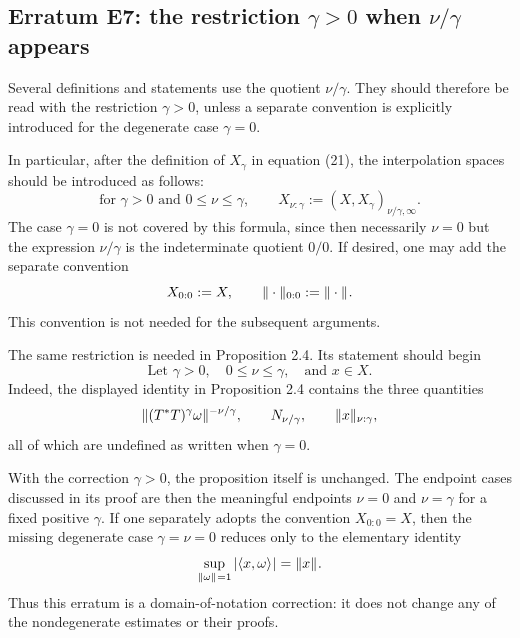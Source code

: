 
\subsection*{Erratum E7: the restriction $\gamma>0$ when $\nu/\gamma$ appears}
\label{s:erratum:E7}

Several definitions and statements use the quotient $\nu/\gamma$.  They
should therefore be read with the restriction $\gamma>0$, unless a separate
convention is explicitly introduced for the degenerate case $\gamma=0$.

In particular, after the definition of $X_\gamma$ in equation (21), the
interpolation spaces should be introduced as follows:
\[
        \text{for } \gamma>0 \text{ and } 0\leq \nu\leq \gamma,
        \qquad
        X_{\nu:\gamma}:=(X,X_\gamma)_{\nu/\gamma,\infty}.
\]
The case $\gamma=0$ is not covered by this formula, since then necessarily
$\nu=0$ but the expression $\nu/\gamma$ is the indeterminate quotient $0/0$.
If desired, one may add the separate convention
\[
        X_{0:0}:=X,
        \qquad
        \| \cdot \|_{ 0:0 }:=\| \cdot \|_{  }.
\]
This convention is not needed for the subsequent arguments.

The same restriction is needed in Proposition 2.4.  Its statement
should begin
\[
        \text{Let } \gamma>0,\quad 0\leq \nu\leq \gamma,
        \quad\text{and }x\in X.
\]
Indeed, the displayed identity in Proposition 2.4 contains the three quantities
\[
        \| (T^*T)^\gamma\omega \|_{  }^{-\nu/\gamma},
        \qquad
        N_{\nu/\gamma},
        \qquad
        \| x \|_{ \nu:\gamma },
\]
all of which are undefined as written when $\gamma=0$.

With the correction $\gamma>0$, the proposition itself is unchanged.  The
endpoint cases discussed in its proof are then the meaningful endpoints
$\nu=0$ and $\nu=\gamma$ for a fixed positive $\gamma$.  If one separately
adopts the convention $X_{0:0}=X$, then the missing degenerate case
$\gamma=\nu=0$ reduces only to the elementary identity
\[
        \sup_{\| \omega \|_{  }=1}|\langle x,\omega \rangle_{  }|
        =
        \| x \|_{  }.
\]
Thus this erratum is a domain-of-notation correction: it does not change any
of the nondegenerate estimates or their proofs.

